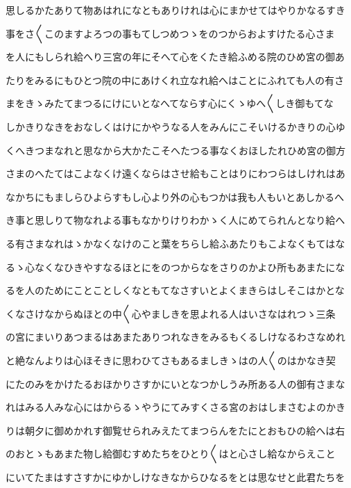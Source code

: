 \documentclass[a4paper,11pt,landscape]{ltjtarticle}
\begin{document}
\par\medskip
思しるかたありて物あはれになともありけれは心にまかせてはやりかなるすき
\par\medskip
事をさ〱このますよろつの事もてしつめつゝをのつからおよすけたる心さま
\par\medskip
を人にもしられ給へり三宮の年にそへて心をくたき給ふめる院のひめ宮の御あ
\par\medskip
たりをみるにもひとつ院の中にあけくれ立なれ給へはことにふれても人の有さ
\par\medskip
まをきゝみたてまつるにけにいとなへてならす心にくゝゆへ〱しき御もてな
\par\medskip
しかきりなきをおなしくはけにかやうなる人をみんにこそいけるかきりの心ゆ
\par\medskip
くへきつまなれと思なから大かたこそへたつる事なくおほしたれひめ宮の御方
\par\medskip
さまのへたてはこよなくけ遠くならはさせ給もことはりにわつらはしけれはあ
\par\medskip
なかちにもましらひよらすもし心より外の心もつかは我も人もいとあしかるへ
\par\medskip
き事と思しりて物なれよる事もなかりけりわかゝく人にめてられんとなり給へ
\par\medskip
る有さまなれはゝかなくなけのこと葉をちらし給ふあたりもこよなくもてはな
\par\medskip
るゝ心なくなひきやすなるほとにをのつからなをさりのかよひ所もあまたにな
\par\medskip
るを人のためにことことしくなともてなさすいとよくまきらはしそこはかとな
\par\medskip
くなさけなからぬほとの中〱心やましきを思よれる人はいさなはれつゝ三条
\par\medskip
の宮にまいりあつまるはあまたありつれなきをみるもくるしけなるわさなめれ
\par\medskip
と絶なんよりは心ほそきに思わひてさもあるましきゝはの人〱のはかなき契
\par\medskip
にたのみをかけたるおほかりさすかにいとなつかしうみ所ある人の御有さまな
\par\medskip
れはみる人みな心にはからるゝやうにてみすくさる宮のおはしまさむよのかき
\par\medskip
りは朝夕に御めかれす御覧せられみえたてまつらんをたにとおもひの給へは右
\par\medskip
のおとゝもあまた物し給御むすめたちをひとり〱はと心さし給なからえこと
\par\medskip
にいてたまはすさすかにゆかしけなきなからひなるをとは思なせと此君たちを
\par\medskip
\end{document}
